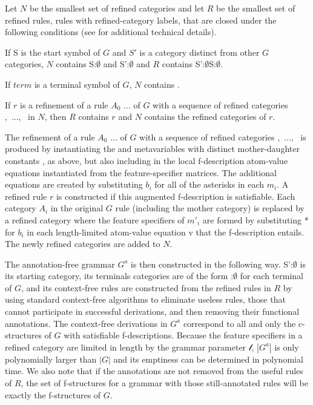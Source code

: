 \documentclass[output=paper,hidelinks]{langscibook}
\begin{document}
Let $N$ be the smallest set of refined categories and let $R$ be the smallest set of refined rules, rules with refined-category labels, that are closed under the following conditions (see \cite{wed:kap:20} for additional technical details).

\ea\label{refinedconditions}
\ea\label{rc1} If S is the start symbol of $G$ and $S'$ is a category distinct from other $G$ categories, $N$ contains S:$\emptyset$ and S':$\emptyset$ and $R$ contains \mbox{S':$\emptyset$\rarrow S:$\emptyset$}.

\ex\label{rc2} If $term$ is a terminal symbol of $G$, $N$ contains  \emptyset. 

\ex\label{rc3} If $r$ is a refinement of a rule $A_0$ \rarrow {}\hsp{-.5em}...  \hsp{-.7em} of $G$ with a sequence of refined categories
\mbox{, ..., } in $N$, then $R$ contains $r$ and $N$ contains the refined categories of $r$.
\z\z

\noindent The refinement of a rule $A_0$ \rarrow {}\hsp{-.5em}...  \hsp{-.7em} of $G$ with a sequence of refined categories \mbox{, ..., } is produced by instantiating the \up and \down metavariables with distinct mother-daughter constants , as above, but also including in the local f-description atom-value equations instantiated from the feature-specifier matrices.  The additional equations are created by substituting $b_i$ for all of the asterisks in each $m_i$. A refined rule $r$ is constructed if this augmented f-description is satisfiable.  Each category $A_i$ in the original $G$ rule (including the mother category) is replaced by a refined category  where the feature specifiers of $m'_i$ are formed by substituting * for $b_i$ in each length-limited atom-value equation v that the f-description entails. The newly refined categories are added to $N$. 

The annotation-free grammar $G^a$ is then constructed in the following way.  S':$\emptyset$ is its starting category, its terminals categories are of the form :$\emptyset$ for each terminal  of $G$, and its context-free rules are constructed from the refined rules in $R$ by using standard context-free algorithms to eliminate useless rules, those that cannot participate in successful derivations, and then removing their functional annotations. The context-free derivations in $G^a$ correspond to all and only the c-structures of $G$ with satisfiable f-descriptions.  Because the feature specifiers in a refined category are limited in length by the grammar parameter $\mathscr l$, $|G^a|$ is only polynomially larger than $|G|$ and its emptiness can be determined in polynomial time. We also note that if the annotations are not removed from the useful rules of $R$, the set of f-structures for a grammar with those still-annotated rules will be exactly the f-structures of $G$.  
 
\end{document}
